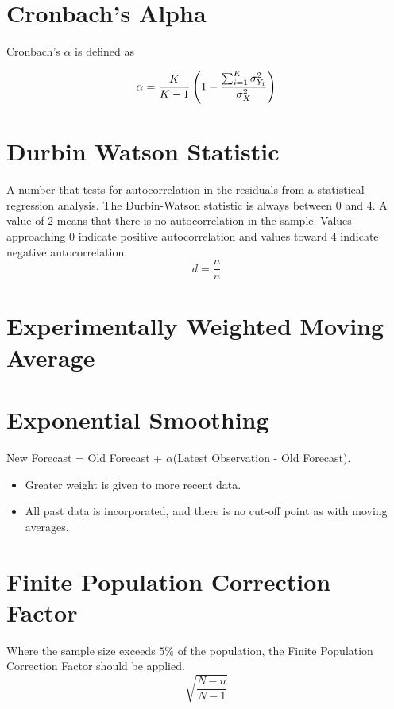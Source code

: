 \begin{enumerate}
\section{Cronbach's Alpha}

Cronbach's $\alpha$ is defined as

\[
\alpha = {K \over K-1 } \left(1 - {\sum_{i=1}^K \sigma^2_{Y_i}\over \sigma^2_X}\right)
\]

\section{Durbin Watson Statistic}

A number that tests for autocorrelation in the residuals from a statistical regression analysis. The Durbin-Watson statistic is always between 0 and 4. A value of 2 means that there is no autocorrelation in the sample. Values approaching 0 indicate positive autocorrelation and values toward 4 indicate negative autocorrelation.
\begin{equation}
d = \frac{n}{n}
\end{equation}
\section{Experimentally Weighted Moving Average}




\section{Exponential Smoothing}

New Forecast = Old Forecast + $\alpha$(Latest Observation - Old Forecast).

\begin{itemize}
	\item Greater weight is given to more recent data.
	\item All past data is incorporated, and there is no cut-off point as with moving averages.
\end{itemize}




\section{Finite Population Correction Factor}
Where the sample size exceeds $5\%$ of the population, the Finite Population Correction Factor should be applied.
\[ \sqrt{\frac{N-n}{N-1}} \]



\end{enumerate}
